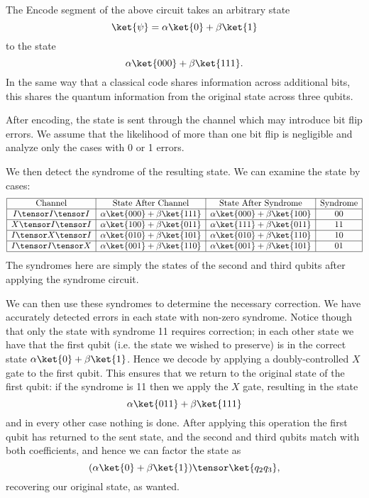 \documentclass{article}
\begin{document}
                The Encode segment of the above circuit takes an arbitrary state
                        $$\ket{\psi} = \alpha \ket{0} + \beta \ket{1}$$
                to the state 
                        $$\alpha \ket{000} + \beta \ket{111}.$$
                In the same way that a classical code shares information across additional bits, this shares the quantum information from the original state across three qubits.

                After encoding, the state is sent through the channel which may introduce bit flip errors.
                We assume that the likelihood of more than one bit flip is negligible and analyze only the cases with 0 or 1 errors.

                We then detect the syndrome of the resulting state.
                We can examine the state by cases:
                $$\begin{array}{|c|c|c|c|}
                \hline
                \text{Channel} & \text{State After Channel} & \text{State After Syndrome} & \text{Syndrome}\\
                \hline
                I \tensor I \tensor I & \alpha \ket{000} + \beta \ket{111} & \alpha \ket{000} + \beta \ket{100} & 00\\
                \hline
                X \tensor I \tensor I & \alpha \ket{100} + \beta \ket{011} & \alpha \ket{111} + \beta \ket{011} & 11\\
                \hline
                I \tensor X \tensor I & \alpha \ket{010} + \beta \ket{101} & \alpha \ket{010} + \beta \ket{110} & 10\\
                \hline
                I \tensor I \tensor X & \alpha \ket{001} + \beta \ket{110} & \alpha \ket{001} + \beta \ket{101} & 01\\
                \hline
                \end{array}
                $$
                The syndromes here are simply the states of the second and third qubits after applying the syndrome circuit.
                
                
                We can then use these syndromes to determine the necessary correction.
                We have accurately detected errors in each state with non-zero syndrome.
                Notice though that only the state with syndrome 11 requires correction; in each other state we have that the first qubit (i.e. the state we wished to preserve) is in the correct state $\alpha \ket{0} + \beta \ket{1}$.
                Hence we decode by applying a doubly-controlled $X$ gate to the first qubit.
                This ensures that we return to the original state of the first qubit: if the syndrome is 11 then we apply the $X$ gate, resulting in the state
                        $$\alpha \ket{011} + \beta \ket{111}$$
                and in every other case nothing is done.
                After applying this operation the first qubit has returned to the sent state, and the second and third qubits match with both coefficients, and hence we can factor the state as
                        $$(\alpha \ket{0} + \beta \ket{1}) \tensor \ket{q_2 q_3},$$
                recovering our original state, as wanted.
                
\end{document}
